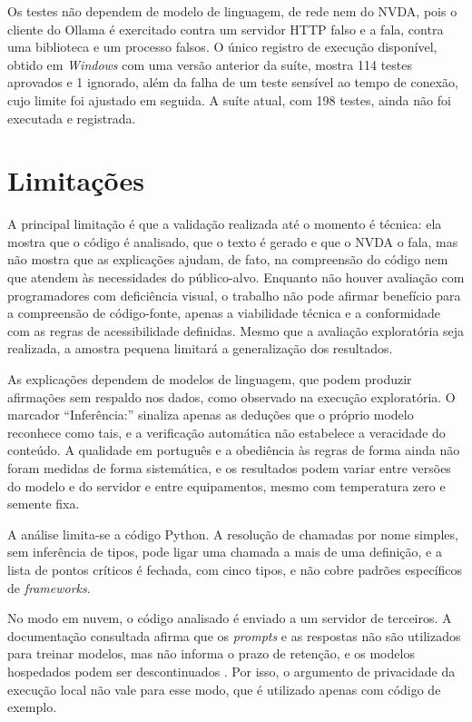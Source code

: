 \documentclass[
    12pt,                   %
    openright,              %
    oneside,                %
    a4paper,                %
    sumario=tradicional,    %
    english,                %
    brazil,                 %
    ]{abntex2}
\begin{document}
Os testes não dependem de modelo de linguagem, de rede nem do NVDA, pois o cliente do Ollama é exercitado contra um servidor HTTP falso e a fala, contra uma biblioteca e um processo falsos. O único registro de execução disponível, obtido em \textit{Windows} com uma versão anterior da suíte, mostra 114 testes aprovados e 1 ignorado, além da falha de um teste sensível ao tempo de conexão, cujo limite foi ajustado em seguida. A suíte atual, com 198 testes, ainda não foi executada e registrada.

\section{Limitações}\label{sec:limitacoes}

A principal limitação é que a validação realizada até o momento é técnica: ela mostra que o código é analisado, que o texto é gerado e que o NVDA o fala, mas não mostra que as explicações ajudam, de fato, na compreensão do código nem que atendem às necessidades do público-alvo. Enquanto não houver avaliação com programadores com deficiência visual, o trabalho não pode afirmar benefício para a compreensão de código-fonte, apenas a viabilidade técnica e a conformidade com as regras de acessibilidade definidas. Mesmo que a avaliação exploratória seja realizada, a amostra pequena limitará a generalização dos resultados.

As explicações dependem de modelos de linguagem, que podem produzir afirmações sem respaldo nos dados, como observado na execução exploratória. O marcador \enquote{Inferência:} sinaliza apenas as deduções que o próprio modelo reconhece como tais, e a verificação automática não estabelece a veracidade do conteúdo. A qualidade em português e a obediência às regras de forma ainda não foram medidas de forma sistemática, e os resultados podem variar entre versões do modelo e do servidor e entre equipamentos, mesmo com temperatura zero e semente fixa.

A análise limita-se a código Python. A resolução de chamadas por nome simples, sem inferência de tipos, pode ligar uma chamada a mais de uma definição, e a lista de pontos críticos é fechada, com cinco tipos, e não cobre padrões específicos de \textit{frameworks}.

No modo em nuvem, o código analisado é enviado a um servidor de terceiros. A documentação consultada afirma que os \textit{prompts} e as respostas não são utilizados para treinar modelos, mas não informa o prazo de retenção, e os modelos hospedados podem ser descontinuados \cite{ollama2026nuvem}. Por isso, o argumento de privacidade da execução local não vale para esse modo, que é utilizado apenas com código de exemplo.
\end{document}
